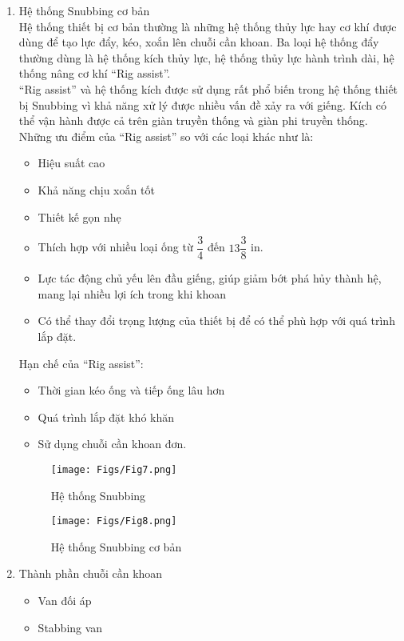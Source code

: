\documentclass[12pt,a4paper]{article}
\begin{document}
	\begin{enumerate}
		\item Hệ thống Snubbing cơ bản\\
		Hệ thống thiết bị cơ bản thường là những hệ thống thủy lực hay cơ khí được dùng để tạo lực đẩy, kéo, xoắn lên chuỗi cần khoan. Ba loại hệ thống đẩy thường dùng là hệ thống kích thủy lực, hệ thống thủy lực hành trình dài, hệ thống nâng cơ khí ``Rig assist''.\\
		``Rig assist'' và hệ thống kích được sử dụng rất phổ biến trong hệ thống thiết bị Snubbing vì khả năng xử lý được nhiều vấn đề xảy ra với giếng. Kích có thể vận hành được cả trên giàn truyền thống và giàn phi truyền thống.\\
		Những ưu điểm của ``Rig assist'' so với các loại khác như là:
		\begin{itemize}
			\item Hiệu suất cao
			\item Khả năng chịu xoắn tốt
			\item Thiết kế gọn nhẹ
			\item Thích hợp với nhiều loại ống từ $\dfrac{3}{4}$ đến $13\dfrac{3}{8}$ in.
			\item Lực tác động chủ yếu lên đầu giếng, giúp giảm bớt phá hủy thành hệ, mang lại nhiều lợi ích trong khi khoan
			\item Có thể thay đổi trọng lượng của thiết bị để có thể phù hợp với quá trình lắp đặt.
		\end{itemize}
		Hạn chế của ``Rig assist'':
		\begin{itemize}
			\item Thời gian kéo ống và tiếp ống lâu hơn
			\item Quá trình lắp đặt khó khăn
			\item Sử dụng chuỗi cần khoan đơn.
		\end{itemize}
		\clearpage
		\begin{figure}[h]
			\centering
			\texttt{[image: Figs/Fig7.png]}
			\caption{Hệ thống Snubbing\cite{rehm2013underbalanced}}
		\end{figure}
		\begin{figure}[h]
			\centering
			\texttt{[image: Figs/Fig8.png]}
			\caption{Hệ thống Snubbing cơ bản\cite{rehm2013underbalanced}}
		\end{figure}
		\item Thành phần chuỗi cần khoan
		\begin{itemize}
			\item Van đối áp
			\item Stabbing van

\end{itemize}
\end{enumerate}
\end{document}
